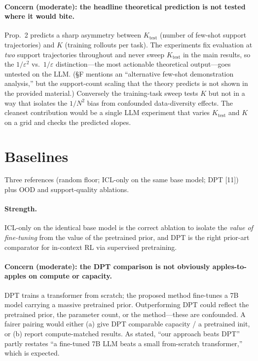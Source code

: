 \documentclass[11pt]{article}
\newcommand{\Ktest}{K_{\mathrm{test}}}
\begin{document}
\paragraph{Concern (moderate): the headline theoretical prediction is not tested where it
would bite.} Prop.\ 2 predicts a sharp asymmetry between $\Ktest$ (number of few-shot support
trajectories) and $K$ (training rollouts per task). The experiments fix evaluation at
\emph{two} support trajectories throughout and never sweep $\Ktest$ in the main results, so
the $1/\varepsilon^2$ vs.\ $1/\varepsilon$ distinction---the most actionable theoretical
output---goes untested on the LLM. (\S F mentions an ``alternative few-shot demonstration
analysis,'' but the support-count scaling that the theory predicts is not shown in the
provided material.) Conversely the training-task sweep tests $K$ but not in a way that isolates
the $1/N^2$ bias from confounded data-diversity effects. The cleanest contribution would be a
single LLM experiment that varies $\Ktest$ and $K$ on a grid and checks the predicted slopes.

\section{Baselines}

Three references (random floor; ICL-only on the same base model; DPT [11]) plus OOD and
support-quality ablations.

\paragraph{Strength.} ICL-only on the identical base model is the correct ablation to isolate
the \emph{value of fine-tuning} from the value of the pretrained prior, and DPT is the right
prior-art comparator for in-context RL via supervised pretraining.

\paragraph{Concern (moderate): the DPT comparison is not obviously apples-to-apples on
compute or capacity.} DPT trains a transformer from scratch; the proposed method fine-tunes a
7B model carrying a massive pretrained prior. Outperforming DPT could reflect the pretrained
prior, the parameter count, or the method---these are confounded. A fairer pairing would
either (a) give DPT comparable capacity / a pretrained init, or (b) report compute-matched
results. As stated, ``our approach beats DPT'' partly restates ``a fine-tuned 7B LLM beats a
small from-scratch transformer,'' which is expected.
\end{document}
